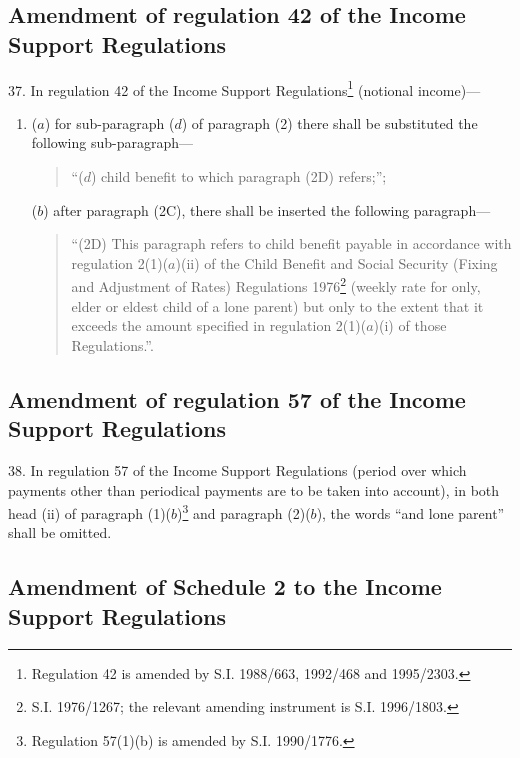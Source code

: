 \documentclass[12pt,a4paper]{article}
\begin{document}
\subsection[37. Amendment of regulation 42 of the Income Support Regulations]{Amendment of regulation 42 of the Income Support Regulations}

37.  In regulation 42 of the Income Support Regulations\footnote{\frenchspacing Regulation 42 is amended by S.I. 1988/663, 1992/468 and 1995/2303.} (notional income)—
\begin{enumerate}\item[]
($a$) for sub-paragraph ($d$) of paragraph (2) there shall be substituted the following sub-paragraph—
\begin{quotation}
“($d$) child benefit to which paragraph (2D) refers;”;
\end{quotation}

($b$) after paragraph (2C), there shall be inserted the following paragraph—
\begin{quotation}
“(2D) This paragraph refers to child benefit payable in accordance with regulation 2(1)($a$)(ii) of the Child Benefit and Social Security (Fixing and Adjustment of Rates) Regulations 1976\footnote{\frenchspacing S.I. 1976/1267; the relevant amending instrument is S.I. 1996/1803.} (weekly rate for only, elder or eldest child of a lone parent) but only to the extent that it exceeds the amount specified in regulation 2(1)($a$)(i) of those Regulations.”.
\end{quotation}
\end{enumerate}

\subsection[38. Amendment of regulation 57 of the Income Support Regulations]{Amendment of regulation 57 of the Income Support Regulations}

38.  In regulation 57 of the Income Support Regulations (period over which payments other than periodical payments are to be taken into account), in both head (ii) of paragraph (1)($b$)\footnote{\frenchspacing Regulation 57(1)(b) is amended by S.I. 1990/1776.} and paragraph (2)($b$), the words “and lone parent” shall be omitted.

\subsection[39. Amendment of Schedule 2 to the Income Support Regulations]{Amendment of Schedule 2 to the Income Support Regulations}
\end{document}
